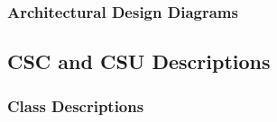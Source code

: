\documentclass{article}
\begin{document}
\subsubsection{Architectural Design Diagrams}
\label{add}


\pagebreak
\subsection{CSC and CSU Descriptions}



\subsubsection{Class Descriptions}
\label{cd}
\end{document}

